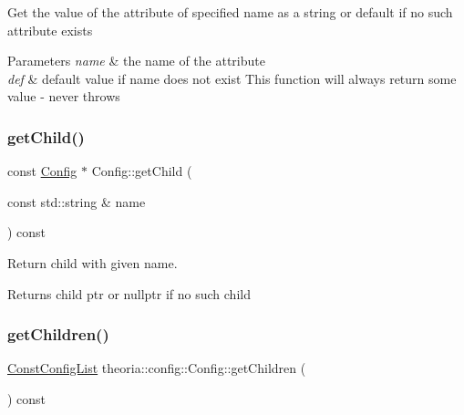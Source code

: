 Get the value of the attribute of specified name as a string or default if no such attribute exists 
\begin{DoxyParams}{Parameters}
{\em name} & the name of the attribute \\
\hline
{\em def} & default value if name does not exist This function will always return some value -\/ never throws \\
\hline
\end{DoxyParams}
\mbox{\label{classtheoria_1_1config_1_1Config_af8e4621be24f1860b1fed707628db7e9}} 
\subsubsection{\texorpdfstring{get\+Child()}{getChild()}}
{\footnotesize\ttfamily const \hyperlink{classtheoria_1_1config_1_1Config}{Config} $\ast$ Config\+::get\+Child (\begin{DoxyParamCaption}\item[{const std\+::string \&}]{name }\end{DoxyParamCaption}) const}

Return child with given name. \begin{DoxyReturn}{Returns}
child ptr or nullptr if no such child 
\end{DoxyReturn}
\mbox{\label{classtheoria_1_1config_1_1Config_ab258c41faac01f6dda0ff0c86adc9903}} 
\subsubsection{\texorpdfstring{get\+Children()}{getChildren()}\hspace{0.1cm}{\footnotesize\ttfamily [1/2]}}
{\footnotesize\ttfamily \hyperlink{classtheoria_1_1config_1_1Config_a61230728ffa4d92667a536c8c0f0ca30}{Const\+Config\+List} theoria\+::config\+::\+Config\+::get\+Children (\begin{DoxyParamCaption}{ }\end{DoxyParamCaption}) const\hspace{0.3cm}{\ttfamily [inline]}}

